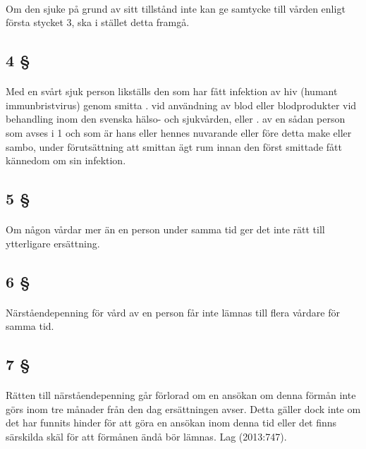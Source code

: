 \documentclass[a4paper,notitlepage,openany,10pt]{book}
\begin{document}
\paragraph*{}
Om den sjuke på grund av sitt tillstånd inte kan ge samtycke till vården enligt första stycket 3, ska i stället detta framgå.
\subsection*{4 §}
\paragraph*{}
Med en svårt sjuk person likställs den som har fått infektion av hiv (humant immunbristvirus) genom smitta
. vid användning av blod eller blodprodukter vid behandling inom den svenska hälso- och sjukvården, eller
. av en sådan person som avses i 1 och som är hans eller hennes nuvarande eller före detta make eller sambo, under förutsättning att smittan ägt rum innan den först smittade fått kännedom om sin infektion.
\subsection*{5 §}
\paragraph*{}
Om någon vårdar mer än en person under samma tid ger det inte rätt till ytterligare ersättning.
\subsection*{6 §}
\paragraph*{}
Närståendepenning för vård av en person får inte lämnas till flera vårdare för samma tid.
\subsection*{7 §}
\paragraph*{}
Rätten till närståendepenning går förlorad om en ansökan om denna förmån inte görs inom tre månader från den dag ersättningen avser. Detta gäller dock inte om det har funnits hinder för att göra en ansökan inom denna tid eller det finns särskilda skäl för att förmånen ändå bör lämnas.
Lag (2013:747).
\end{document}
